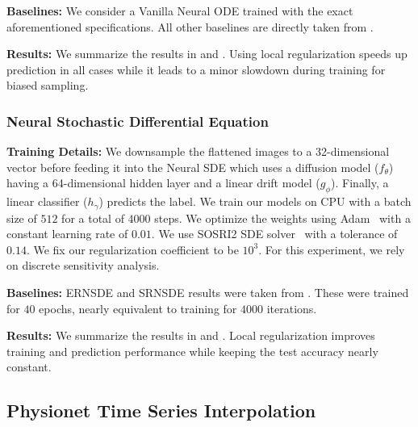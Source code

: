 \textbf{Baselines:} We consider a Vanilla Neural ODE trained with the exact aforementioned specifications. All other baselines are directly taken from \citet{pal2021opening}.

\textbf{Results:} We summarize the results in  and . Using local regularization speeds up prediction in all cases while it leads to a minor slowdown during training for biased sampling.


\subsubsection{Neural Stochastic Differential Equation}
\label{subsubsec:mnist_nsde}

\textbf{Training Details:} We downsample the flattened images to a 32-dimensional vector before feeding it into the Neural SDE which uses a diffusion model ($f_\theta$) having a 64-dimensional hidden layer and a linear drift model ($g_\phi$). Finally, a linear classifier ($h_\gamma$) predicts the label.
%
%
We train our models on CPU with a batch size of $512$ for a total of $4000$ steps. We optimize the weights using Adam~\citep{kingma2017adam} with a constant learning rate of $0.01$. We use SOSRI2 SDE solver~\citep{rackauckas2017adaptive} with a tolerance of $0.14$. We fix our regularization coefficient to be $10^3$. For this experiment, we rely on discrete sensitivity analysis.

\textbf{Baselines:} ERNSDE and SRNSDE results were taken from \citet{pal2021opening}. These were trained for $40$ epochs, nearly equivalent to training for $4000$ iterations.

\textbf{Results:} We summarize the results in  and . Local regularization improves training and prediction performance while keeping the test accuracy nearly constant.


\subsection{Physionet Time Series Interpolation}
\label{subsec:physionet}


